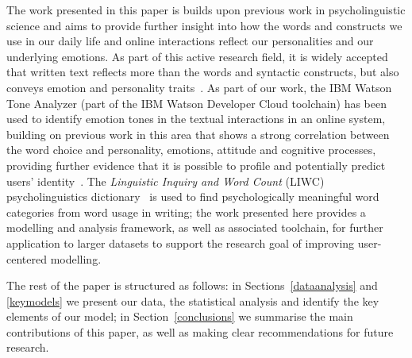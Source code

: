 \documentclass[graybox]{svmult}
\begin{document}
The work presented in this paper is builds upon previous work in
psycholinguistic science and aims to provide further insight into how
the words and constructs we use in our daily life and online
interactions reflect our personalities and our underlying emotions. As
part of this active research field, it is widely accepted that written
text reflects more than the words and syntactic constructs, but also
conveys emotion and personality traits~\cite{pennebaker+king:1999}. As
part of our work, the IBM Watson Tone Analyzer (part of the IBM Watson
Developer Cloud toolchain) has been used to identify emotion tones in
the textual interactions in an online system, building on previous
work in this area that shows a strong correlation between the word
choice and personality, emotions, attitude and cognitive processes,
providing further evidence that it is possible to profile and
potentially predict users’ identity~\cite{fast+funder:2008}. The
{\emph{Linguistic Inquiry and Word Count}} (LIWC) psycholinguistics
dictionary~\cite{pennebaker-et-al:2001,tausczik+pennebaker:2010} is
used to find psychologically meaningful word categories from word
usage in writing; the work presented here provides a modelling and
analysis framework, as well as associated toolchain, for further
application to larger datasets to support the research goal of
improving user-centered modelling.

The rest of the paper is structured as follows: in
Sections~\ref{dataanalysis} and \ref{keymodels} we present our data,
the statistical analysis and identify the key elements of our model;
in Section~\ref{conclusions} we summarise the main contributions of
this paper, as well as making clear recommendations for future
research.


\end{document}

